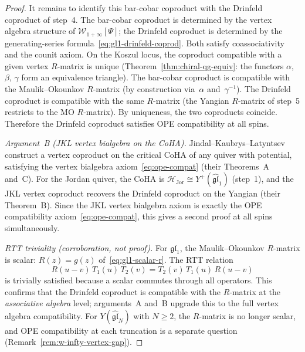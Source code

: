 \documentclass[11pt,reqno]{amsart}
\theoremstyle{definition}
\theoremstyle{remark}
\newcommand{\cH}{\mathcal{H}}
\newcommand{\cW}{\mathcal{W}}
\numberwithin{equation}{section}
\begin{document}
\begin{proof}
It remains to identify this bar-cobar coproduct with the
Drinfeld coproduct of step~4. The bar-cobar coproduct
is determined by the vertex algebra structure of
$\cW_{1+\infty}[\Psi]$; the Drinfeld coproduct is
determined by the generating-series
formula~\eqref{eq:gl1-drinfeld-coprod}. Both satisfy
coassociativity and the counit axiom. On the Koszul locus,
the coproduct compatible with a given vertex $R$-matrix is
unique (Theorem~\ref{thm:chiral-qg-equiv}: the functors
$\alpha$, $\beta$, $\gamma$ form an equivalence triangle).
The bar-cobar coproduct is compatible with the
Maulik--Okounkov $R$-matrix (by construction via~$\alpha$
and~$\gamma^{-1}$). The Drinfeld coproduct is compatible
with the same $R$-matrix (the Yangian $R$-matrix of
step~5 restricts to the MO $R$-matrix). By uniqueness,
the two coproducts coincide. Therefore the Drinfeld
coproduct satisfies OPE compatibility at all spins.

\smallskip
\noindent\emph{Argument~B \textup{(}JKL vertex bialgebra
on the CoHA\textup{)}.}
Jindal--Kaubrys--Latyntsev~\cite{JKL26} construct a vertex
coproduct on the critical CoHA of any quiver with potential,
satisfying the vertex bialgebra
axiom~\eqref{eq:ope-compat} (their Theorems~A and~C).
For the Jordan quiver, the CoHA is
$\cH_{\mathrm{Jor}} \cong Y^+(\widehat{\mathfrak{gl}}_1)$
(step~1), and the JKL vertex coproduct recovers the
Drinfeld coproduct on the Yangian (their Theorem~B).
Since the JKL vertex bialgebra axiom is exactly the OPE
compatibility axiom~\eqref{eq:ope-compat}, this gives a
second proof at all spins simultaneously.

\smallskip
\noindent\emph{RTT triviality \textup{(}corroboration,
not proof\textup{)}.}
For $\mathfrak{gl}_1$, the Maulik--Okounkov $R$-matrix is
scalar:
$R(z) = g(z)$ of~\eqref{eq:gl1-scalar-r}. The RTT
relation
\begin{equation}\label{eq:rtt-gl1}
  R(u - v)\, T_1(u)\, T_2(v)
  = T_2(v)\, T_1(u)\, R(u - v)
\end{equation}
is trivially satisfied because a scalar commutes through
all operators. This confirms that the Drinfeld coproduct is
compatible with the $R$-matrix at the \emph{associative
algebra} level; arguments~A and~B upgrade this to the
full vertex algebra compatibility.
For $Y(\widehat{\mathfrak{gl}}_N)$ with $N \geq 2$,
the $R$-matrix is no longer scalar, and OPE compatibility
at each truncation is a separate question
(Remark~\ref{rem:w-infty-vertex-gap}).


\end{proof}
\end{document}
